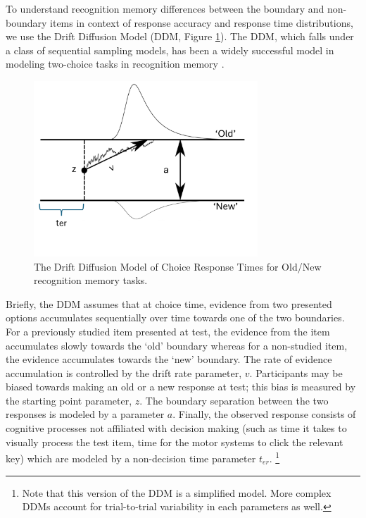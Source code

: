 To understand recognition memory differences between the boundary and non-boundary items in context of response accuracy and response time distributions, we use the Drift Diffusion Model (DDM, Figure \ref{fig:ddm-model}). The DDM, which falls under a class of sequential sampling models, has been a widely successful model in modeling two-choice tasks in recognition memory \parencite{ratcliff2004diffusion, ratcliff2022discriminating, starns2014using, starns2014validating, ratcliff2009modeling}. 

\begin{figure}[ht]
    \centering
    \includegraphics[width = 0.75\textwidth]{chapter_notebooks/chapter_3/figures/ddm.png}
    \caption{The Drift Diffusion Model of Choice Response Times for Old/New recognition memory tasks.}
    \label{fig:ddm-model}
\end{figure}

Briefly, the DDM assumes that at choice time, evidence from two presented options accumulates sequentially over time towards one of the two boundaries. For a previously studied item presented at test, the evidence from the item accumulates slowly towards the `old' boundary whereas for a non-studied item, the evidence accumulates towards the `new' boundary. The rate of evidence accumulation is controlled by the drift rate parameter, $v$. Participants may be biased towards making an old or a new response at test; this bias is measured by the starting point parameter, $z$. The boundary separation between the two responses is modeled by a parameter $a$. Finally, the observed response consists of cognitive processes not affiliated with decision making (such as time it takes to visually process the test item, time for the motor systems to click the relevant key) which are modeled by a non-decision time parameter $t_{er}$. \footnote{Note that this version of the DDM is a simplified model. More complex DDMs account for trial-to-trial variability in each parameters as well.} 

